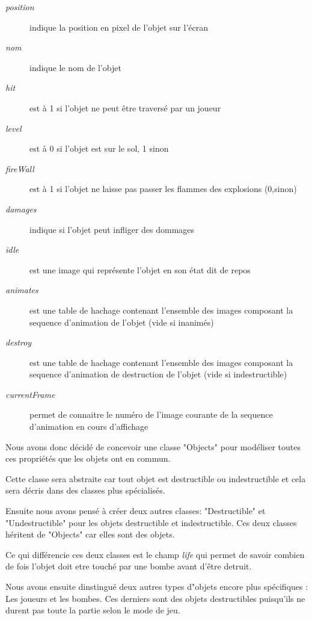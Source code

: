	\begin{description}
		\item [\textit{position}]{indique la position en pixel de l'objet sur l'écran}
		\item [\textit{nom}]{indique le nom de l'objet}
		\item [\textit{hit}]{est à 1 si l'objet ne peut être traversé par un joueur}
		\item [\textit{level}]{est à 0 si l'objet est sur le sol, 1 sinon}
		\item [\textit{fireWall}]{est à 1 si l'objet ne laisse pas passer les flammes des explosions (0,sinon)}
		\item [\textit{damages}]{indique si l'objet peut infliger des dommages}
		\item [\textit{idle}]{est une image qui représente l'objet en son état dit de repos}
		\item [\textit{animates}]{est une table de hachage contenant l'ensemble des images composant la sequence d'animation de l'objet (vide si inanimés)}
		\item [\textit{destroy}]{est une table de hachage contenant l'ensemble des images composant la sequence d'animation de destruction de l'objet (vide si indestructible)}
		\item [\textit{currentFrame}]{permet de connaitre le numéro de l'image courante de la sequence d'animation en cours d'affichage}
	\end{description}

		Nous avons donc décidé de concevoir une classe "Objects" pour modéliser
		 toutes ces propriétés que les objets ont en commun.
		 
		Cette classe sera abstraite car tout objet est destructible ou 
		indestructible et cela sera décris dans des classes plus spécialisés.
	
	 	Ensuite nous avons pensé à créer deux autres classes: "Destructible" 
	 	et "Undestructible" pour les objets destructible et indestructible.
	 	Ces deux classes héritent de "Objects" car elles sont des objets.
	 	
	 	Ce qui différencie ces deux classes est le champ \textit{life} qui 
	 	permet de savoir combien de fois l'objet doit etre touché par une 
	 	bombe avant d'être detruit.
	
		Nous avons ensuite dinstingué deux autres types d"objets encore plus spécifiques :
		Les joueurs et les bombes.
		Ces derniers sont des objets destructibles puisqu'ils ne durent pas 
		toute la partie selon le mode de jeu.
	
